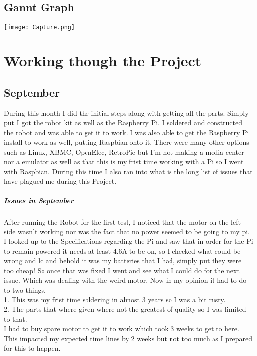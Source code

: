 \documentclass[13ptletterpaper]{paper}
\newcommand\tab[1][1cm]{\hspace*{#1}}
\begin{document}
\begin{flushleft}
		\subsection{Gannt Graph}
		\texttt{[image: Capture.png]}
		\section{Working though the Project}
		\subsection{September}
		\tab During this month I did the initial steps along with getting all the parts. Simply put I got the robot kit as well as the Raspberry Pi. I soldered and constructed the robot and was able to get it to work. I was also able to get the Raspberry Pi install to work as well, putting Raspbian onto it. There were many other options such as Linux, XBMC, OpenElec, RetroPie but I'm not making a media center nor a emulator as well as that this is my frist time working with a Pi so I went with Raspbian. During this time I also ran into what is the long list of issues that have plagued me during this Project.
		\subparagraph{Issues in September} After running the Robot for the first test, I noticed that the motor on the left side wasn't working nor was the fact that no power seemed to be going to my pi. I looked up to the Specifications regarding the Pi and saw that in order for the Pi to remain powered it needs at least 4.6A to be on, so I checked what could be wrong and lo and behold it was my batteries that I had, simply put they were too cheap! So once that was fixed I went and see what I could do for the next issue. Which was dealing with the weird motor. Now in my opinion it had to do to two things. \\
		\tab 1. This was my frist time soldering in almost 3 years so I was a bit rusty.\\
		\tab 2. The parts that where given where not the greatest of quality so I was limited to that.\\
		I had to buy spare motor to get it to work which took 3 weeks to get to here. This impacted my expected time lines by 2 weeks but not too much as I prepared for this to happen. \\
		

\end{flushleft}
\end{document}
